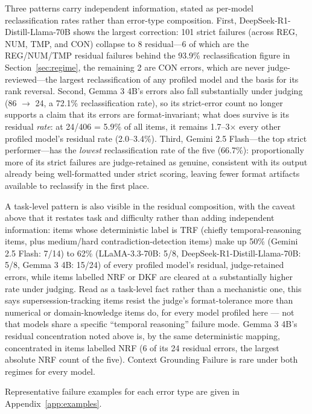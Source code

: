 Three patterns carry independent information, stated as per-model reclassification rates rather
than error-type composition. First, DeepSeek-R1-Distill-Llama-70B shows the largest correction: 101
strict failures (across REG, NUM, TMP, and CON) collapse to 8 residual---6 of which are the
REG/NUM/TMP residual failures behind the 93.9\% reclassification figure in
Section~\ref{sec:regime}, the remaining 2 are CON errors, which are never judge-reviewed---the
largest reclassification of any profiled model and the basis for its rank reversal. Second, Gemma
3 4B's errors also fall substantially under judging (86 $\rightarrow$ 24, a 72.1\% reclassification
rate), so its strict-error count no longer supports a claim that its errors are format-invariant;
what does survive is its residual \emph{rate}: at 24/406 = 5.9\% of all items, it remains
1.7--3$\times$ every other profiled model's residual rate (2.0--3.4\%). Third, Gemini
2.5 Flash---the top strict performer---has the \emph{lowest} reclassification rate of the five
(66.7\%): proportionally more of its strict failures are judge-retained as genuine, consistent with
its output already being well-formatted under strict scoring, leaving fewer format artifacts
available to reclassify in the first place.

A task-level pattern is also visible in the residual composition, with the caveat above that it
restates task and difficulty rather than adding independent information: items whose deterministic
label is TRF (chiefly temporal-reasoning items, plus medium/hard contradiction-detection items) make
up 50\% (Gemini 2.5 Flash: 7/14) to 62\% (LLaMA-3.3-70B: 5/8, DeepSeek-R1-Distill-Llama-70B: 5/8,
Gemma 3 4B: 15/24) of every profiled model's residual, judge-retained errors, while items labelled
NRF or DKF are cleared at a substantially higher rate under judging. Read as a task-level fact rather
than a mechanistic one, this says supersession-tracking items resist the judge's format-tolerance
more than numerical or domain-knowledge items do, for every model profiled here --- not that models
share a specific ``temporal reasoning'' failure mode. Gemma 3 4B's residual concentration noted above
is, by the same deterministic mapping, concentrated in items labelled NRF (6 of its 24 residual
errors, the largest absolute NRF count of the five). Context Grounding Failure is rare under both
regimes for every model.

Representative failure examples for each error type are given in Appendix~\ref{app:examples}.
